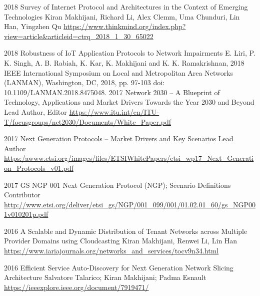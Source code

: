 \begin{entrylist}
\entry
{2018} 
{Survey of Internet Protocol and Architectures in the Context of Emerging Technologies}
{Kiran Makhijani, Richard Li, Alex Clemm, Uma Chunduri, Lin Han, Yingzhen Qu}
{\url{https://www.thinkmind.org/index.php?view=article&articleid=ctrq_2018_1_30_65022}}

\entry
{2018}
{Robustness of IoT Application Protocols to Network Impairments}
{E. Liri, P. K. Singh, A. B. Rabiah, K. Kar, K. Makhijani and K. K. Ramakrishnan, 2018 IEEE International Symposium on Local and Metropolitan Area Networks (LANMAN), Washington, DC, 2018, pp. 97-103}
{doi: 10.1109/LANMAN.2018.8475048.}
\entry
{2017} 
{Network 2030 – A Blueprint of Technology, Applications and Market Drivers Towards the Year 2030 and Beyond}
{Lead Author, Editor}
{\url{https://www.itu.int/en/ITU-T/focusgroups/net2030/Documents/White_Paper.pdf}}

\entry
{2017} 
{Next Generation Protocols – Market Drivers and Key Scenarios}
{Lead Author}
{\url{https:/awww.etsi.org/images/files/ETSIWhitePapers/etsi_wp17_Next_Generation_Protocols_v01.pdf}}
 
\entry
{2017} 
{GS NGP 001 Next Generation Protocol (NGP); Scenario Definitions} {Contributor}
{\url{http://www.etsi.org/deliver/etsi_gs/NGP/001_099/001/01.02.01_60/gs_NGP001v010201p.pdf}}

\entry
{2016} 
{A Scalable and Dynamic Distribution of Tenant Networks across Multiple Provider Domains using Cloudcasting}
{Kiran Makhijani, Renwei Li, Lin Han}
{\url{https://www.iariajournals.org/networks_and_services/tocv9n34.html}}

\entry
{2016} 
{Efficient Service Auto-Discovery for Next Generation Network Slicing Architecture}
{Salvatore Talarico; Kiran Makhijani; Padma Esnault}
{\url{https://ieeexplore.ieee.org/document/7919471/}}

\end{entrylist}
